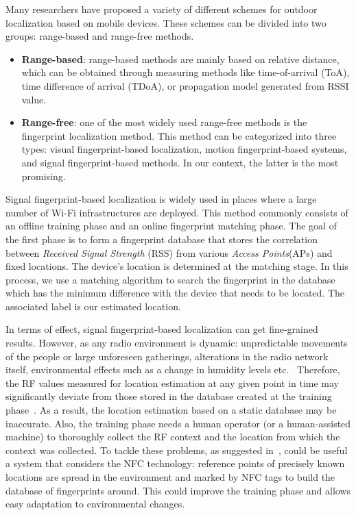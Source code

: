 Many researchers have proposed a variety of different schemes for outdoor localization based on mobile devices. These schemes can be divided into two
groups: range-based and range-free methods.

\begin{itemize}
	\item \textbf{Range-based}: range-based methods are mainly based on relative distance, which can be obtained through measuring methods like
	      time-of-arrival (ToA), time difference of arrival (TDoA), or propagation model generated from RSSI value.
	\item \textbf{Range-free}: one of the most widely used range-free methods is the fingerprint localization method.
	      This method can be categorized into three types:
	      visual fingerprint-based localization, motion fingerprint-based systems, and signal fingerprint-based methods.
	      In our context, the latter is the most promising.
\end{itemize}

Signal fingerprint-based localization is widely used in places where a large number of Wi-Fi infrastructures are deployed. This method commonly
consists of an offline training phase and an online fingerprint matching phase. The goal of the first phase is to form a fingerprint database that
stores the correlation between \textit{Received Signal Strength} (RSS) from various \textit{Access Points}(APs) and fixed locations. The device's
location is determined at the matching stage. In this process, we use a matching algorithm to search the fingerprint in the database which has the
minimum difference with the device that needs to be located. The associated label is our estimated location.

In terms of effect, signal fingerprint-based localization can get fine-grained results. However, as any radio environment is dynamic: unpredictable
movements of the people or large unforeseen gatherings, alterations in the radio network itself, environmental effects such as a change in humidity
levels etc.~\cite{chaudhry2013indoor} Therefore, the RF values measured for location estimation at any given point in time may significantly deviate
from those stored in the database created at the training phase~\cite{chaudhry2013indoor}. As a result, the location estimation based on a static
database may be inaccurate. Also, the training phase needs a human operator (or a human-assisted machine) to thoroughly collect the RF context and
the location from which the context was collected. To tackle these problems, as suggested in~\cite{chaudhry2013indoor}, could be useful a system that
considers the NFC technology: reference points of precisely known locations are spread in the environment and marked by NFC tags to build the database
of fingerprints around. This could improve the training phase and allows easy adaptation to environmental changes.

